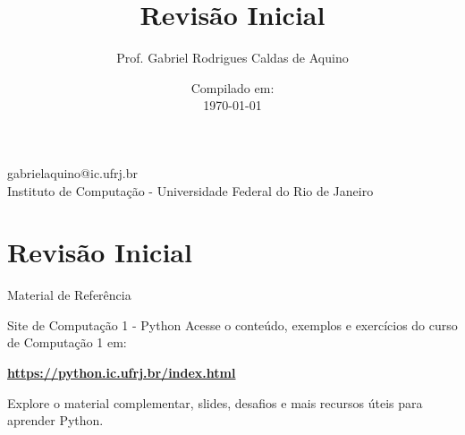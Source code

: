 \title{Revisão Inicial}

\author{Prof. Gabriel Rodrigues Caldas de Aquino}

\institute
{
    gabrielaquino@ic.ufrj.br\\
    
    Instituto de Computação -
    Universidade Federal do Rio de Janeiro %
}
\date{Compilado em: \\ \today} %


\section{Revisão Inicial}

\begin{frame}
    \titlepage
\end{frame}

\begin{frame}{Material de Referência}

\begin{block}{Site de Computação 1 - Python}
Acesse o conteúdo, exemplos e exercícios do curso de Computação 1 em:

\centering
\href{https://python.ic.ufrj.br/index.html}{\textbf{https://python.ic.ufrj.br/index.html}}

\vspace{1em}

Explore o material complementar, slides, desafios e mais recursos úteis para aprender Python.
\end{block}

\end{frame}



